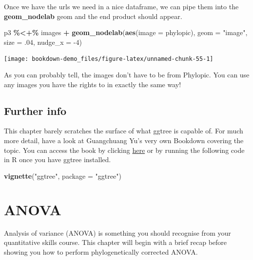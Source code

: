 \documentclass[
]{book}
\newenvironment{Shaded}{\begin{snugshade}}{\end{snugshade}}
\newcommand{\DataTypeTok}[1]{\textcolor[rgb]{0.13,0.29,0.53}{#1}}
\newcommand{\DecValTok}[1]{\textcolor[rgb]{0.00,0.00,0.81}{#1}}
\newcommand{\FloatTok}[1]{\textcolor[rgb]{0.00,0.00,0.81}{#1}}
\newcommand{\KeywordTok}[1]{\textcolor[rgb]{0.13,0.29,0.53}{\textbf{#1}}}
\newcommand{\NormalTok}[1]{#1}
\newcommand{\OperatorTok}[1]{\textcolor[rgb]{0.81,0.36,0.00}{\textbf{#1}}}
\newcommand{\StringTok}[1]{\textcolor[rgb]{0.31,0.60,0.02}{#1}}
\begin{document}
Once we have the urls we need in a nice dataframe, we can pipe them into the \textbf{geom\_nodelab} geom and the end product should appear.

\begin{Shaded}
\begin{Highlighting}[]
\NormalTok{p3 }\OperatorTok{\%\textless{}+\%}\StringTok{ }\NormalTok{images }\OperatorTok{+}
\StringTok{  }\KeywordTok{geom\_nodelab}\NormalTok{(}\KeywordTok{aes}\NormalTok{(}\DataTypeTok{image =}\NormalTok{ phylopic), }\DataTypeTok{geom =} \StringTok{"image"}\NormalTok{, }\DataTypeTok{size =} \FloatTok{.04}\NormalTok{, }\DataTypeTok{nudge\_x =} \DecValTok{{-}4}\NormalTok{)}
\end{Highlighting}
\end{Shaded}

\begin{center}\texttt{[image: bookdown-demo\_files/figure-latex/unnamed-chunk-55-1]} \end{center}

As you can probably tell, the images don't have to be from Phylopic. You can use any images you have the rights to in exactly the same way!

\hypertarget{further-info-1}{%
\section{Further info}\label{further-info-1}}

This chapter barely scratches the surface of what ggtree is capable of. For much more detail, have a look at Guangchuang Yu's very own Bookdown covering the topic. You can access the book by clicking \href{https://yulab-smu.github.io/treedata-book/}{here} or by running the following code in R once you have ggtree installed.

\begin{Shaded}
\begin{Highlighting}[]
\KeywordTok{vignette}\NormalTok{(}\StringTok{"ggtree"}\NormalTok{, }\DataTypeTok{package =} \StringTok{"ggtree"}\NormalTok{)}
\end{Highlighting}
\end{Shaded}

\hypertarget{anova}{%
\chapter{ANOVA}\label{anova}}

Analysis of variance (ANOVA) is something you should recognise from your quantitative skills course. This chapter will begin with a brief recap before showing you how to perform phylogenetically corrected ANOVA.
\end{document}
